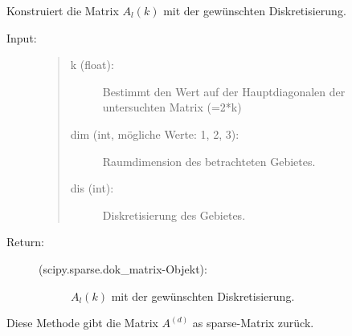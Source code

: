 \documentclass[a4paper,10pt,ngerman, openright]{sphinxmanual}
\begin{document}
\begin{fulllineitems}
\begin{fulllineitems}
\begin{description}
\begin{description}
\end{description}

\end{description}

\end{fulllineitems}


\begin{fulllineitems}
\label{\detokenize{index:sparse.Sparse.constr_mat_l_k}}
Konstruiert die Matrix $A_l(k)$ mit der gewünschten Diskretisierung.

\begin{description}
\item[{Input:}]\leavevmode
\begin{quote}
\begin{description}
\item[{k (float):}] \leavevmode
Bestimmt den Wert auf der Hauptdiagonalen der untersuchten Matrix (=2*k)

\item[{dim (int, mögliche Werte: 1, 2, 3):}] \leavevmode
Raumdimension des betrachteten Gebietes.

\item[{dis (int):}] \leavevmode
Diskretisierung des Gebietes.
\end{description}

\end{quote}
\end{description}
\begin{description}
\item[{Return:}] \leavevmode\begin{description}
\item[{(scipy.sparse.dok\_matrix-Objekt):}] \leavevmode
$A_l(k)$ mit der gewünschten Diskretisierung.

\end{description}

\end{description}

\end{fulllineitems}


\begin{fulllineitems}
\label{\detokenize{index:sparse.Sparse.return_mat_d}}
Diese Methode gibt die Matrix $A^{(d)}$ as sparse-Matrix zurück.



\end{fulllineitems}
\end{fulllineitems}
\end{document}
